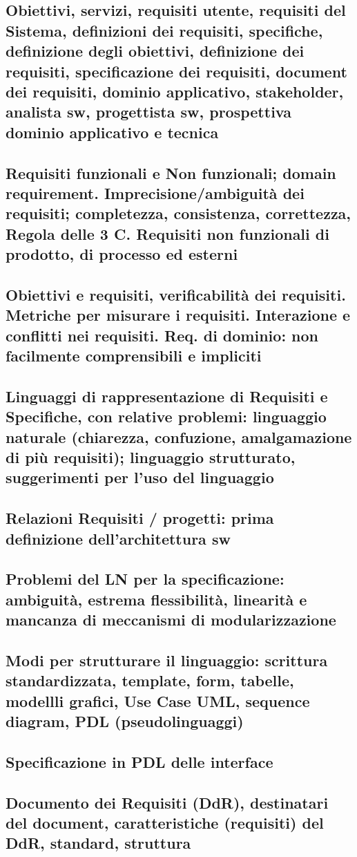 \subsection{Obiettivi, servizi, requisiti utente, requisiti del Sistema, definizioni dei requisiti, specifiche, definizione degli obiettivi, definizione dei requisiti, specificazione dei requisiti, document dei requisiti, dominio applicativo, stakeholder, analista sw, progettista sw, prospettiva dominio applicativo e tecnica}
\subsection{Requisiti funzionali e Non funzionali; domain requirement. Imprecisione/ambiguità dei requisiti; completezza, consistenza, correttezza, Regola delle 3 C. Requisiti non funzionali di prodotto, di processo ed esterni}
\subsection{Obiettivi e requisiti, verificabilità dei requisiti. Metriche per misurare i requisiti. Interazione e conflitti nei requisiti. Req. di dominio: non facilmente comprensibili e impliciti}
\subsection{Linguaggi di rappresentazione di Requisiti e Specifiche, con relative problemi: linguaggio naturale (chiarezza, confuzione, amalgamazione di più requisiti); linguaggio strutturato, suggerimenti per l’uso del linguaggio}
\subsection{Relazioni Requisiti / progetti: prima definizione dell’architettura sw}
\subsection{Problemi del LN per la specificazione: ambiguità, estrema flessibilità, linearità e mancanza di meccanismi di modularizzazione}
\subsection{Modi per strutturare il linguaggio: scrittura standardizzata, template, form, tabelle, modellli grafici, Use Case UML, sequence diagram, PDL (pseudolinguaggi)}
\subsection{Specificazione in PDL delle interface}
\subsection{Documento dei Requisiti (DdR), destinatari del document, caratteristiche (requisiti) del DdR, standard, struttura}